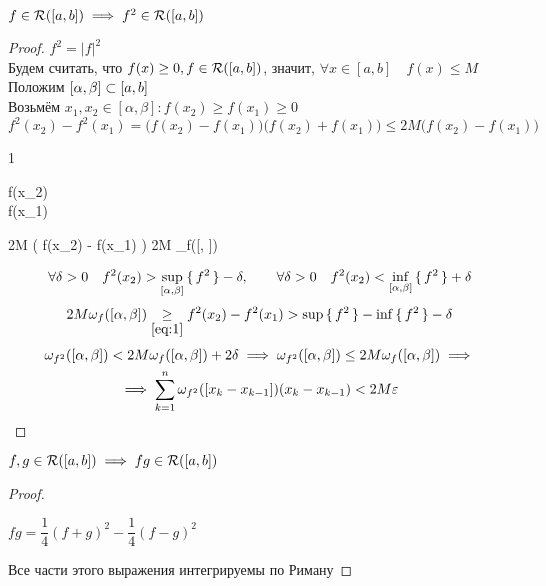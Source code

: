 \begin{props}
	\item $ f \in \mathcal{R}([a, b]) \implies f^2 \in \mathcal{R}([a, b]) $
	\begin{proof}
		$ f^2 = |f|^2 $ \\
		Будем считать, что $ f(x) \ge 0, f \in \mathcal{R}([a, b]) $, значит, $ \forall x \in [a, b] \quad f(x) \le M $ \\
		Положим $ [\alpha, \beta] \subset [a, b] $ \\
		Возьмём $ x_1, x_2 \in [\alpha, \beta] : f(x_2) \ge f(x_1) \ge 0 $
		$$ f^2(x_2) - f^2(x_1) = \bigg( f(x_2) - f(x_1) \bigg) \bigg( f(x_2) + f(x_1) \bigg) \le 2M \bigg( f(x_2) - f(x_1) \bigg) $$
		\begin{equ}1
			\begin{rcases}
				f(x_2) \le \sup{} \\
				f(x_1) \ge \inf{}
			\end{rcases} \implies 2M \bigg( f(x_2) - f(x_1) \bigg) \le 2M \omega_f([\alpha, \beta])
		\end{equ}
		$$ \forall \delta > 0 \quad f^2(x_2) > \sup\limits_{[\alpha, \beta]}\set{f^2} - \delta, \qquad \forall \delta > 0 \quad f^2(x_2) < \inf\limits_{[\alpha, \beta]}\set{f^2} + \delta $$
		$$ 2M \omega_f([\alpha, \beta]) \underset{\eref1}\ge f^2(x_2) - f^2(x_1) > \sup\set{f^2} - \inf\set{f^2} - \delta $$
		\begin{multline*}
			\omega_{f^2}([\alpha, \beta]) < 2M \omega_f([\alpha, \beta]) + 2\delta \implies \omega_{f^2}([\alpha, \beta]) \le 2M\omega_f([\alpha, \beta]) \implies \\ \implies \sum_{k = 1}^n \omega_{f^2}([x_k - x_{k - 1}])(x_k - x_{k - 1}) < 2M\varepsilon
		\end{multline*}
	\end{proof}
	\item $ f, g \in \mathcal{R}([a, b]) \implies fg \in \mathcal{R}([a, b]) $
	\begin{proof}
		\begin{intuition}
			$ fg = \dfrac14(f + g)^2 - \dfrac14(f - g)^2 $
		\end{intuition}
		Все части этого выражения интегрируемы по Риману
	\end{proof}
\end{props}

